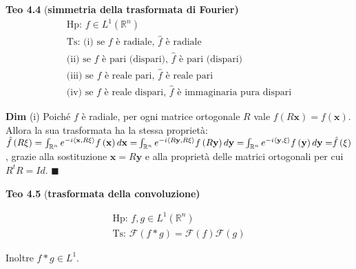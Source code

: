 \documentclass{article}
\begin{document}
\textbf{Teo 4.4} (\textbf{simmetria della trasformata di Fourier)}
\begin{gather*}
\text{Hp: }f\in L^{1}\left( 
\mathbb{R}
^{n}\right) \\
\text{Ts: (i) se }f\text{ \`{e} radiale, }\hat{f}\text{ \`{e} radiale} \\
\text{(ii) se }f\text{ \`{e} pari (dispari), }\hat{f}\text{ \`{e} pari
(dispari)} \\
\text{(iii) se }f\text{ \`{e} reale pari, }\hat{f}\text{ \`{e} reale pari} \\
\text{(iv) se }f\text{ \`{e} reale dispari, }\hat{f}\text{ \`{e} immaginaria
pura dispari}
\end{gather*}

\textbf{Dim} (i) Poich\'{e} $f$ \`{e} radiale, per ogni matrice ortogonale $%
R $ vale $f\left( R\mathbf{x}\right) =f\left( \mathbf{x}\right) $. Allora la
sua trasformata ha la stessa propriet\`{a}: $\hat{f}\left( R\mathbf{\xi }%
\right) =\int_{%
\mathbb{R}
^{n}}e^{-i\left\langle \mathbf{x,}R\mathbf{\xi }\right\rangle }f\left( 
\mathbf{x}\right) d\mathbf{x=}\int_{%
\mathbb{R}
^{n}}e^{-i\left\langle R\mathbf{y,}R\mathbf{\xi }\right\rangle }f\left( R%
\mathbf{y}\right) d\mathbf{y=}\int_{%
\mathbb{R}
^{n}}e^{-i\left\langle \mathbf{y,\xi }\right\rangle }f\left( \mathbf{y}%
\right) d\mathbf{y=}\hat{f}\left( \mathbf{\xi }\right) $, grazie alla
sostituzione $\mathbf{x}=R\mathbf{y}$ e alla propriet\`{a} delle matrici
ortogonali per cui $R^{t}R=Id$. $\blacksquare $

\textbf{Teo 4.5 }(\textbf{trasformata della convoluzione)}

\begin{gather*}
\text{Hp: }f,g\in L^{1}\left( 
\mathbb{R}
^{n}\right) \\
\text{Ts: }\mathcal{F}\left( f\ast g\right) =\mathcal{F}\left( f\right) 
\mathcal{F}\left( g\right)
\end{gather*}

Inoltre $f\ast g\in L^{1}$.
\end{document}

